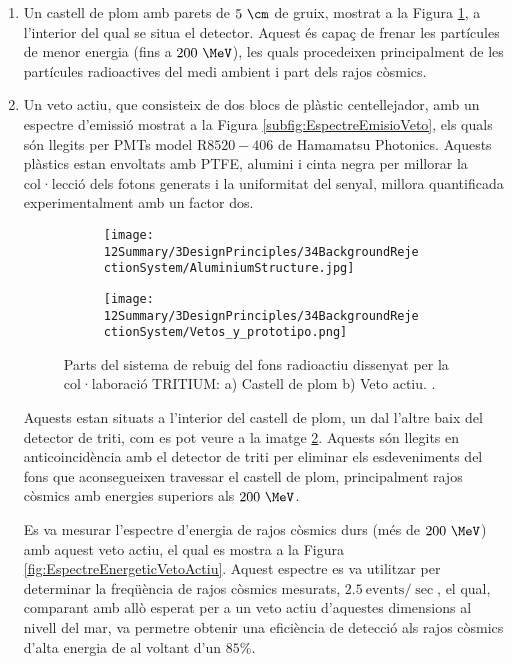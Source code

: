 \begin{enumerate}

\item{} Un castell de plom amb parets de $5~\cm$ de gruix, mostrat a la Figura \ref{subfig:CastellPlom}, a l'interior del qual se situa el detector. Aquest és capaç de frenar les partícules de menor energia (fins a $200~\MeV$), les quals procedeixen principalment de les partícules radioactives del medi ambient i part dels rajos còsmics.

\item{} Un veto actiu, que consisteix de dos blocs de plàstic centellejador, amb un espectre d'emissió mostrat a la Figura \ref{subfig:EspectreEmisioVeto}, els quals són llegits per PMTs model R$8520-406$ de Hamamatsu Photonics. Aquests plàstics estan envoltats amb PTFE, alumini i cinta negra per millorar la col·lecció dels fotons generats i la uniformitat del senyal, millora quantificada experimentalment amb un factor dos.

\begin{figure}
\centering
    \begin{subfigure}[b]{0.7\textwidth}
    \centering
    \texttt{[image: 12Summary/3DesignPrinciples/34BackgroundRejectionSystem/AluminiumStructure.jpg]}  
        \caption{}\label{subfig:CastellPlom}
    \end{subfigure}
    \hfill
    \begin{subfigure}[b]{0.7\textwidth}
    \centering
    \texttt{[image: 12Summary/3DesignPrinciples/34BackgroundRejectionSystem/Vetos\_y\_prototipo.png]}  
    \caption{\label{subfig:VetoActiu}}
    \end{subfigure}
\caption{Parts del sistema de rebuig del fons radioactiu dissenyat per la col·laboració TRITIUM: a) Castell de plom b) Veto actiu. \label{fig:SistemaRebuigFonsRadioactiu}.}
\end{figure}

Aquests estan situats a l'interior del castell de plom, un dal l'altre baix del detector de triti, com es pot veure a la imatge \ref{subfig:VetoActiu}. Aquests són llegits en anticoincidència amb el detector de triti per eliminar els esdeveniments del fons que aconsegueixen travessar el castell de plom, principalment rajos còsmics amb energies superiors als $200~\MeV$. 

Es va mesurar l'espectre d'energia de rajos còsmics durs (més de $200~\MeV$) amb aquest veto actiu, el qual es mostra a la Figura \ref{fig:EspectreEnergeticVetoActiu}. Aquest espectre es va utilitzar per determinar la freqüència de rajos còsmics mesurats, $2.5~\text{events}/\sec$, el qual, comparant amb allò esperat per a un veto actiu d'aquestes dimensions al nivell del mar, va permetre obtenir una eficiència de detecció als rajos còsmics d'alta energia de al voltant d'un $85\%$.


\end{enumerate}

